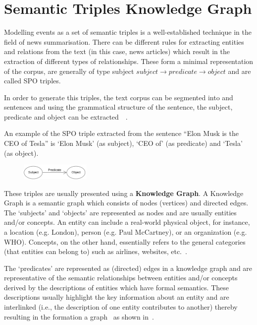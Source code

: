 \section{Semantic Triples Knowledge Graph}  \label{Knowledge_graph}

Modelling events as a set of semantic triples is a well-established technique in the field of news summarisation. There can be different rules for extracting entities and relations from the text (in this case, news articles) which result in the extraction of different types of relationships. These form a minimal representation of the corpus, are generally of type subject $subject \rightarrow predicate \rightarrow object$ and are called SPO triples.

In order to generate this triples, the text corpus can be segmented into and sentences and using the grammatical structure of the sentence, the subject, predicate and object can be extracted~\cite{retrospective_kg}~\cite{6_world2014rdf}.

An example of the SPO triple extracted from the sentence ``Elon Musk is the CEO of Tesla'' is `Elon Musk' (as subject), `CEO of' (as predicate) and `Tesla' (as object).

\begin{figure}[H]
    \centering
    \includegraphics[width=0.3\textwidth]{images/spo.png}
\end{figure}

These triples are usually presented using a \textbf{Knowledge Graph}. A Knowledge Graph is a semantic graph which consists of nodes (vertices) and directed edges. The `subjects' and `objects' are represented as nodes and are usually entities and/or concepts. An entity can include a real-world physical object, for instance, a location (e.g. London), person (e.g. Paul McCartney), or an organization (e.g. WHO). Concepts, on the other hand, essentially refers to the general categories (that entities can belong to) such as airlines, websites, etc.~\cite{retrospective_kg}.

The `predicates' are represented as (directed) edges in a knowledge graph and are representative of the semantic relationships between entities and/or concepts derived by the descriptions of entities which have formal semantics. These descriptions usually highlight the key information about an entity and are interlinked (i.e., the description of one entity contributes to another) thereby resulting in the formation a graph~\cite{retrospective_kg} as shown in~.

